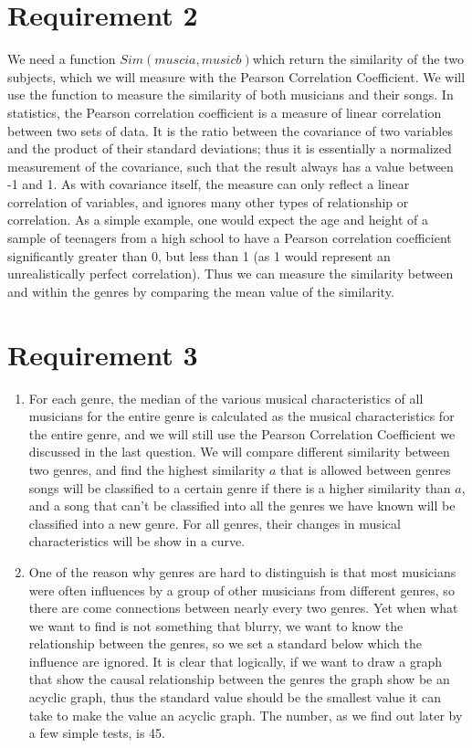 \documentclass[12pt]{article}
\begin{document}
\section{Requirement 2}
We need a function $Sim(musci a, music b)$which return the similarity of the two subjects, which we will measure with the Pearson Correlation Coefficient.
We will use the function to
measure the similarity of both musicians and their songs. In statistics, the Pearson correlation coefficient  is a measure of linear correlation between
two sets of data. It is the ratio between the covariance of two variables and the product of their standard deviations; thus it is essentially a normalized
measurement of the covariance, such that the result always has a value between -1 and 1. As with covariance itself, the measure can only reflect a linear
correlation of variables, and ignores many other types of relationship or correlation. As a simple example, one would expect the age and height of
a sample of teenagers from a high school to have a Pearson correlation coefficient significantly greater than 0, but less than 1
(as 1 would represent an unrealistically perfect correlation).
Thus we can measure the similarity between and within the genres by comparing the mean value of the similarity.
\section{Requirement 3}
\begin{enumerate}
    \item For each genre, the median of the various musical characteristics of all musicians for the entire genre is calculated as the musical characteristics
          for the entire genre, and we will still use the Pearson Correlation Coefficient we discussed in the last question. We will compare different similarity between two
          genres, and find the highest similarity $a$ that is allowed between genres songs will be classified to a certain genre if there is a higher similarity than $a$, and a song
          that can't be classified into all the genres we have known will be classified into a new genre. For all genres, their changes in musical characteristics will be show in
          a curve.

    \item One of the reason why genres are hard to distinguish is that most musicians were often influences by a group of other musicians from different genres, so there are
          come connections between nearly every two genres. Yet when what we want to find is not something that blurry, we want to know the relationship between the genres,
          so we set a standard below which the influence are ignored. It is clear that logically, if we want to draw a graph that show the causal relationship between the genres
          the graph show be an acyclic graph, thus the standard value should be the smallest value it can take to make the value an acyclic graph. The number, as we find out later
          by a few simple tests, is 45.
\end{enumerate}
\end{document}

